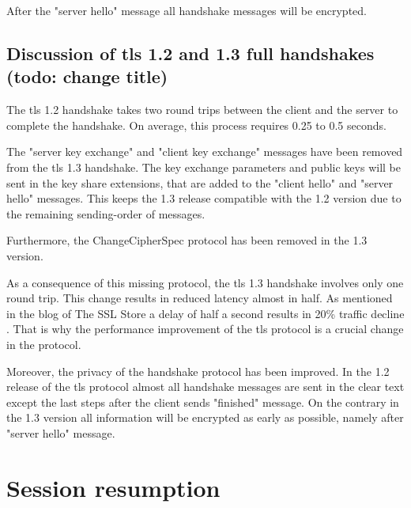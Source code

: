 After the "server hello" message all handshake messages will be encrypted.
\cite{recorla}
\subsection{Discussion of \gls{tls} 1.2 and 1.3 full handshakes (todo: change title)}
\label{subsec:comparison_handshake}

The \gls{tls} 1.2 handshake takes two round trips between the client and the server to complete the handshake. On average, this process requires 0.25 to 0.5 seconds.

The "server key exchange" and "client key exchange" messages have been removed from the \gls{tls} 1.3 handshake. The key exchange parameters and public keys will be sent in the key share extensions, that are added to the "client hello" and "server hello" messages. This keeps the 1.3 release compatible with the 1.2 version due to the remaining sending-order of messages.

Furthermore, the ChangeCipherSpec protocol has been removed in the 1.3 version. 

As a consequence of this missing protocol, the \gls{tls} 1.3 handshake involves only one round trip. This change results in reduced latency almost in half. As mentioned in the blog of The SSL Store a delay of half a second results in 20\% traffic decline \cite{sslstore:handshake}. That is why the performance improvement of the \gls{tls} protocol is a crucial change in the protocol.

Moreover, the privacy of the handshake protocol has been improved. In the 1.2 release of the \gls{tls} protocol almost all handshake messages are sent in the clear text except the last steps after the client sends "finished" message. On the contrary in the 1.3 version all information will be encrypted as early as possible, namely after "server hello" message. 

\section{Session resumption}
\label{sec:comparison_resumption}

